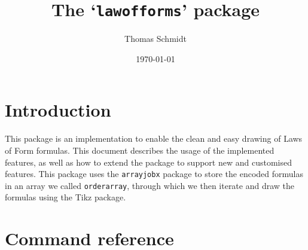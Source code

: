 \documentclass[12pt]{article}
\title{The `\texttt{lawofforms}' package}
\author{Thomas Schmidt}
\date{\today}
\newcommand{\BS}{\texttt{\symbol{`\\}}}
\newcommand{\Macro}[1]{\texttt{\BS#1}}
\begin{document}
\maketitle

\section{Introduction}\label{introduction}

This package is an implementation to enable the clean and easy drawing of Laws of Form\cite{LoF} formulas. This document describes the usage of the implemented features, as well as how to extend the package to support new and customised features. This package uses the \texttt{arrayjobx} package\cite{arrayjobx} to store the encoded formulas in an array we called \Macro{orderarray}, through which we then iterate and draw the formulas using the Tikz package\cite{tikz}.

\section{Command reference}\label{commands}

\end{document}
